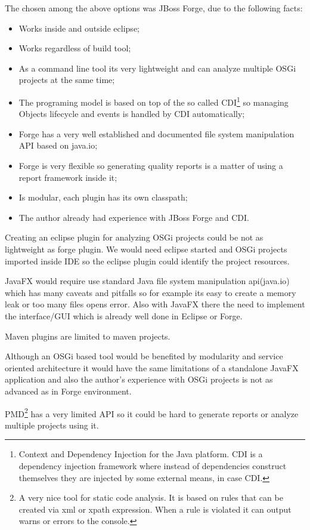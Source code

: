 The chosen among the above options was JBoss Forge, due to the following facts:

\begin{itemize}
\item Works inside and outside eclipse;
\item Works regardless of build tool;
\item As a command line tool its very lightweight and can analyze multiple OSGi projects at the same time;
\item The programing model is based on top of the so called CDI\footnote{Context and Dependency Injection for the Java platform. CDI is a dependency injection framework where instead of dependencies construct themselves they are injected by some external means, in case CDI.} so managing Objects lifecycle and events is handled by CDI automatically;
\item Forge has a very well established and documented file system manipulation API based on java.io;
\item Forge is very flexible so generating quality reports is a matter of using a report framework inside it;  
\item Is modular, each plugin has its own classpath;
\item The author already had experience with JBoss Forge and CDI. 
\end{itemize}

Creating an eclipse plugin for analyzing OSGi projects could be not as lightweight as forge plugin. We would need eclipse started and OSGi projects imported inside IDE so the eclipse plugin could identify the project resources.

JavaFX would require use standard Java file system manipulation api(java.io) which has many caveats and pitfalls so for example its easy to create a memory leak or too many files opens error. Also with JavaFX there the need to implement the interface/GUI which is already well done in Eclipse or Forge.

Maven plugins are limited to maven projects.

Although an OSGi based tool would be benefited by modularity and service oriented architecture it would have the same limitations of a standalone JavaFX application and also the author's experience with OSGi projects is not as advanced as in Forge environment. 

PMD\footnote{A very nice tool for static code analysis. It is based on rules that can be created via xml or xpath expression. When a rule is violated it can output warns or errors to the console.} has a very limited API so it could be hard to generate reports or analyze multiple projects using it. 

